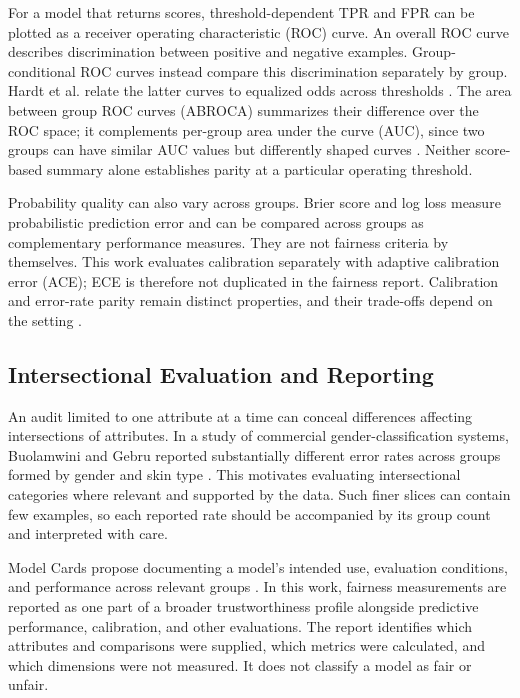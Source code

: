 \documentclass[12pt,a4paper]{article}
\begin{document}
For a model that returns scores, threshold-dependent TPR and FPR can be plotted as a receiver operating characteristic (ROC) curve. An overall ROC curve describes discrimination between positive and negative examples. Group-conditional ROC curves instead compare this discrimination separately by group. Hardt et al. relate the latter curves to equalized odds across thresholds \cite{hardt2016}. The area between group ROC curves (ABROCA) summarizes their difference over the ROC space; it complements per-group area under the curve (AUC), since two groups can have similar AUC values but differently shaped curves \cite{gardner2019}. Neither score-based summary alone establishes parity at a particular operating threshold.

Probability quality can also vary across groups. Brier score and log loss measure probabilistic prediction error and can be compared across groups as complementary performance measures. They are not fairness criteria by themselves. This work evaluates calibration separately with adaptive calibration error (ACE); ECE is therefore not duplicated in the fairness report. Calibration and error-rate parity remain distinct properties, and their trade-offs depend on the setting \cite{pleiss2017}.

\subsection{Intersectional Evaluation and Reporting}

An audit limited to one attribute at a time can conceal differences affecting intersections of attributes. In a study of commercial gender-classification systems, Buolamwini and Gebru reported substantially different error rates across groups formed by gender and skin type \cite{buolamwini2018}. This motivates evaluating intersectional categories where relevant and supported by the data. Such finer slices can contain few examples, so each reported rate should be accompanied by its group count and interpreted with care.

Model Cards propose documenting a model's intended use, evaluation conditions, and performance across relevant groups \cite{mitchell2019}. In this work, fairness measurements are reported as one part of a broader trustworthiness profile alongside predictive performance, calibration, and other evaluations. The report identifies which attributes and comparisons were supplied, which metrics were calculated, and which dimensions were not measured. It does not classify a model as fair or unfair.
\end{document}
